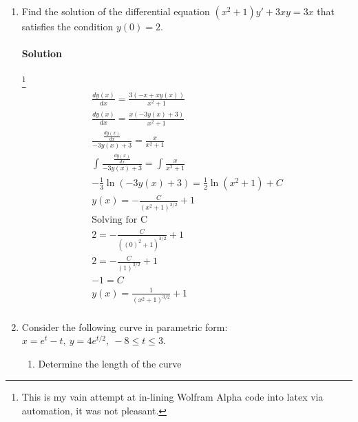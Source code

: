 \documentclass[MATH-115-Notes.tex]{subfiles}
\begin{document}
\begin{enumerate}
    \item Find the solution of the differential equation \((x^2 + 1)y' + 3xy = 3x\) that satisfies the condition $y(0) = 2$.
    \paragraph{Solution}
    \footnote{This is my vain attempt at in-lining Wolfram Alpha code into latex via automation, it was not pleasant.} 
    \begin{gather*}
        \frac{dy(x)}{dx} = \frac{3(-x + x y(x))}{x^2 + 1}\\
        \frac{dy(x)}{dx} = \frac{x(-3y(x)+3)}{x^2 + 1}\\
        \frac{ \frac{dy(x)}{dx}}{-3y(x) + 3} = \frac{x}{x^2 + 1}\\
        \int_{}^{} \frac{ \frac{dy(x)}{dx}}{-3y(x) + 3} = \int_{}^{} \frac{x}{x^2 + 1}\\
        - \frac{1}{3}\ln(-3y(x) + 3) = \frac{1}{2}\ln(x^2 + 1) + C\\
        y(x) = - \frac{C}{(x^2 + 1)^{3/2}} + 1\\
        \text{Solving for C}\\
        2 =  - \frac{C}{((0)^2 + 1)^{3/2}} + 1\\
        2 =  - \frac{C}{(1)^{3/2}} + 1\\
        - 1 = C\\
        y(x) = \frac{1}{(x^2 + 1)^{3/2}} + 1\\
    \end{gather*}
    \item Consider the following curve in parametric form: $ x = e^t - t,\ y = 4e^{t/2},\ -8 \leq t \leq 3$.
    \begin{enumerate}
        \item Determine the length of the curve

\end{enumerate}
\end{enumerate}
\end{document}
